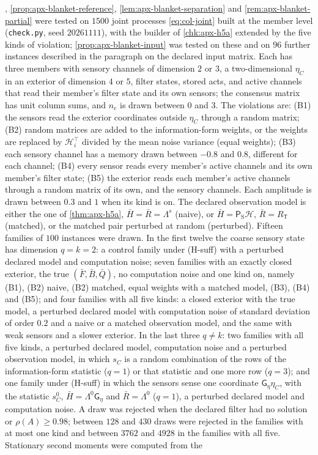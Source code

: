 \begin{numcheck}\label{chk:apx-h5a-blanket}
, \cref{prop:apx-blanket-reference}, \cref{lem:apx-blanket-separation} and \cref{rem:apx-blanket-partial} were tested on $1500$ joint processes \eqref{eq:col-joint} built at the member level (\texttt{check.py}, seed $20261111$), with the builder of \cref{chk:apx-h5a} extended by the five kinds of violation; \cref{prop:apx-blanket-input} was tested on these and on $96$ further instances described in the paragraph on the declared input matrix. Each has three members with sensory channels of dimension $2$ or $3$, a two-dimensional $\eta_C$ in an exterior of dimension $4$ or $5$, filter states, stored acts, and active channels that read their member's filter state and its own sensors; the consensus matrix has unit column sums, and $n_{\mathrm c}$ is drawn between $0$ and $3$. The violations are: (B1) the sensors read the exterior coordinates outside $\eta_C$ through a random matrix; (B2) random matrices are added to the information-form weights, or the weights are replaced by $\mathcal H_i^\top$ divided by the mean noise variance (equal weights); (B3) each sensory channel has a memory drawn between $-0.8$ and $0.8$, different for each channel; (B4) every sensor reads every member's active channels and its own member's filter state; (B5) the exterior reads each member's active channels through a random matrix of its own, and the sensory channels. Each amplitude is drawn between $0.3$ and $1$ when its kind is on. The declared observation model is either the one of \cref{thm:apx-h5a}, $\bar H=\bar R=\Lambda^s$ (naive), or $\bar H=\mathsf P_{\mathrm S}\mathcal H$, $\bar R=R_{\mathsf T}$ (matched), or the matched pair perturbed at random (perturbed). Fifteen families of $100$ instances were drawn. In the first twelve the coarse sensory state has dimension $q=k=2$: a control family under (H-suff) with a perturbed declared model and computation noise; seven families with an exactly closed exterior, the true $(\bar F,\bar B,\bar Q)$, no computation noise and one kind on, namely (B1), (B2) naive, (B2) matched, equal weights with a matched model, (B3), (B4) and (B5); and four families with all five kinds: a closed exterior with the true model, a perturbed declared model with computation noise of standard deviation of order $0.2$ and a naive or a matched observation model, and the same with weak sensors and a slower exterior. In the last three $q\ne k$: two families with all five kinds, a perturbed declared model, computation noise and a perturbed observation model, in which $s_C$ is a random combination of the rows of the information-form statistic ($q=1$) or that statistic and one more row ($q=3$); and one family under (H-suff) in which the sensors sense one coordinate $\mathsf G_\eta\eta_C$, with the statistic $s^0_C$, $\bar H=\Lambda^0\mathsf G_\eta$ and $\bar R=\Lambda^0$ ($q=1$), a perturbed declared model and computation noise. A draw was rejected when the declared filter had no solution or $\rho(A)\ge0.98$; between $128$ and $430$ draws were rejected in the families with at most one kind and between $3762$ and $4928$ in the families with all five. Stationary second moments were computed from the 
\end{numcheck}
